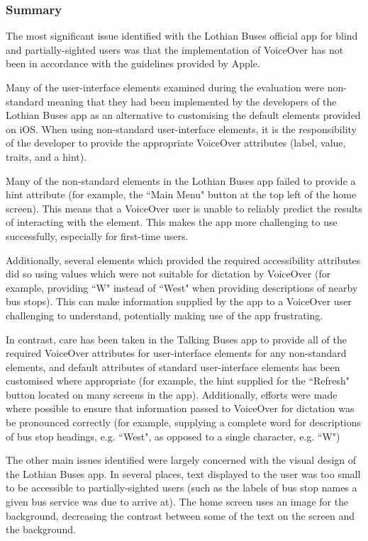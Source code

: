 \documentclass[10pt,twocolumn]{article}
\begin{document}
\subsubsection{Summary}

The most significant issue identified with the Lothian Buses official app for blind and partially-sighted users was that the implementation of VoiceOver has not been in accordance with the guidelines provided by Apple.

Many of the user-interface elements examined during the evaluation were non-standard meaning that they had been implemented by the developers of the Lothian Buses app as an alternative to customising the default elements provided on iOS. When using non-standard user-interface elements, it is the responsibility of the developer to provide the appropriate VoiceOver attributes (label, value, traits, and a hint).

Many of the non-standard elements in the Lothian Buses app failed to provide a hint attribute (for example, the ``Main Menu" button at the top left of the home screen). This means that a VoiceOver user is unable to reliably predict the results of interacting with the element. This makes the app more challenging to use successfully, especially for first-time users.

Additionally, several elements which provided the required accessibility attributes did so using values which were not suitable for dictation by VoiceOver (for example, providing ``W" instead of ``West" when providing descriptions of nearby bus stops). This can make information supplied by the app to a VoiceOver user challenging to understand, potentially making use of the app frustrating.

In contrast, care has been taken in the Talking Buses app to provide all of the required VoiceOver attributes for user-interface elements for any non-standard elements, and default attributes of standard user-interface elements has been customised where appropriate (for example, the hint supplied for the ``Refresh" button located on many screens in the app). Additionally, efforts were made where possible to ensure that information passed to VoiceOver for dictation was be pronounced correctly (for example, supplying a complete word for descriptions of bus stop headings, e.g. ``West",  as opposed to a single character, e.g. ``W")

The other main issues identified were largely concerned with the visual design of the Lothian Buses app. In several places, text displayed to the user was too small to be accessible to partially-sighted users (such as the labels of bus stop names a given bus service was due to arrive at). The home screen uses an image for the background, decreasing the contrast between some of the text on the screen and the background.
\end{document}
